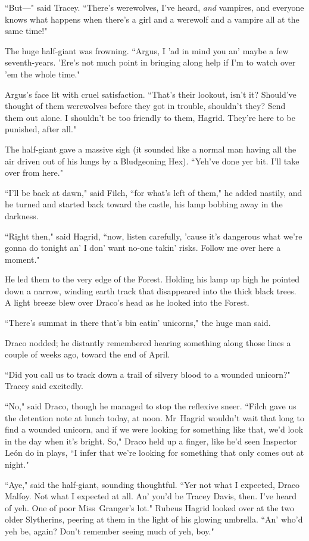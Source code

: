 ``But—" said Tracey. ``There's werewolves, I've heard, \emph{and} vampires, and everyone knows what happens when there's a girl and a werewolf and a vampire all at the same time!"

The huge half-giant was frowning. ``Argus, I 'ad in mind you an' maybe a few seventh-years. 'Ere's not much point in bringing along help if I'm to watch over 'em the whole time."

Argus's face lit with cruel satisfaction. ``That's their lookout, isn't it? Should've thought of them werewolves before they got in trouble, shouldn't they? Send them out alone. I shouldn't be too friendly to them, Hagrid. They're here to be punished, after all."

The half-giant gave a massive sigh (it sounded like a normal man having all the air driven out of his lungs by a Bludgeoning Hex). ``Yeh've done yer bit. I'll take over from here."

``I'll be back at dawn," said Filch, ``for what's left of them," he added nastily, and he turned and started back toward the castle, his lamp bobbing away in the darkness.

``Right then," said Hagrid, ``now, listen carefully, 'cause it's dangerous what we're gonna do tonight an' I don' want no-one takin' risks. Follow me over here a moment."

He led them to the very edge of the Forest. Holding his lamp up high he pointed down a narrow, winding earth track that disappeared into the thick black trees. A light breeze blew over Draco's head as he looked into the Forest.

``There's summat in there that's bin eatin' unicorns," the huge man said.

Draco nodded; he distantly remembered hearing something along those lines a couple of weeks ago, toward the end of April.

``Did you call us to track down a trail of silvery blood to a wounded unicorn?" Tracey said excitedly.

``No," said Draco, though he managed to stop the reflexive sneer. ``Filch gave us the detention note at lunch today, at noon. Mr~Hagrid wouldn't wait that long to find a wounded unicorn, and if we were looking for something like that, we'd look in the day when it's bright. So," Draco held up a finger, like he'd seen Inspector León do in plays, ``I infer that we're looking for something that only comes out at night."

``Aye," said the half-giant, sounding thoughtful. ``Yer not what I expected, Draco Malfoy. Not what I expected at all. An' you'd be Tracey Davis, then. I've heard of yeh. One of poor Miss~Granger's lot." Rubeus Hagrid looked over at the two older Slytherins, peering at them in the light of his glowing umbrella. ``An' who'd yeh be, again? Don't remember seeing much of yeh, boy."

